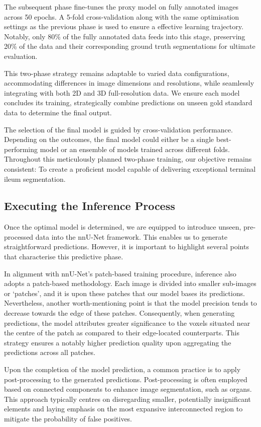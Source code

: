 The subsequent phase fine-tunes the proxy model on fully annotated images across 50 epochs. A 5-fold cross-validation along with the same optimisation settings as the previous phase is used to ensure a effective learning trajectory. Notably, only 80\% of the fully annotated data feeds into this stage, preserving 20\% of the data and their corresponding ground truth segmentations for ultimate evaluation.

This two-phase strategy remains adaptable to varied data configurations, accommodating differences in image dimensions and resolutions, while seamlessly integrating with both 2D and 3D full-resolution data. We ensure each model concludes its training, strategically combine predictions on unseen gold standard data to determine the final output.

The selection of the final model is guided by cross-validation performance. Depending on the outcomes, the final model could either be a single best-performing model or an ensemble of models trained across different folds. Throughout this meticulously planned two-phase training, our objective remains consistent: To create a proficient model capable of delivering exceptional terminal ileum segmentation.

\subsection{Executing the Inference Process}

Once the optimal model is determined, we are equipped to introduce unseen, pre-processed data into the nnU-Net framework. This enables us to generate straightforward predictions. However, it is important to highlight several points that characterise this predictive phase.

In alignment with nnU-Net's patch-based training procedure, inference also adopts a patch-based methodology. Each image is divided into smaller sub-images or `patches', and it is upon these patches that our model bases its predictions. Nevertheless, another worth-mentioning point is that the model precision tends to decrease towards the edge of these patches. Consequently, when generating predictions, the model attributes greater significance to the voxels situated near the centre of the patch as compared to their edge-located counterparts. This strategy ensures a notably higher prediction quality upon aggregating the predictions across all patches.

Upon the completion of the model prediction, a common practice is to apply post-processing to the generated predictions. Post-processing is often employed based on connected components to enhance image segmentation, such as organs. This approach typically centres on disregarding smaller, potentially insignificant elements and laying emphasis on the most expansive interconnected region to mitigate the probability of false positives.

